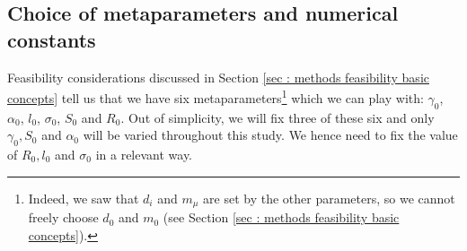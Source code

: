 \documentclass[12pt]{report}
\begin{document}
\subsection{Choice of metaparameters and numerical constants}\label{sec: choice of metaparameters}

Feasibility considerations discussed in Section \ref{sec : methods feasibility basic concepts} tell us that we have six metaparameters\footnote{Indeed, we saw that $d_i$ and $m_\mu$ are set by the other parameters, so we cannot freely choose $d_0$ and $m_0$ (see Section \ref{sec : methods feasibility basic concepts}).} which we can play with: $\gamma_0$, $\alpha_0$, $l_0$, $\sigma_0$, $S_0$ and $R_0$. Out of simplicity, we will fix three of these six and only $\gamma_0, S_0$ and $\alpha_0$ will be varied throughout this study. We hence need to fix the value of $R_0, l_0$ and $\sigma_0$ in a relevant way.
\end{document}
